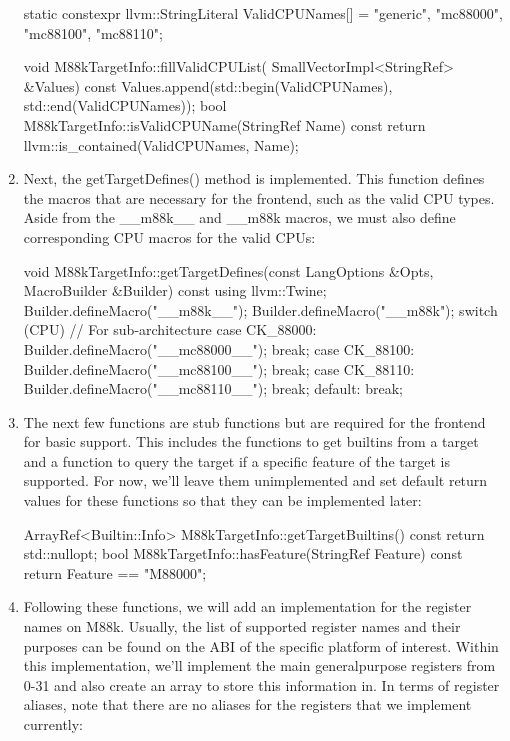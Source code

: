 \begin{enumerate}
\begin{cpp}
static constexpr llvm::StringLiteral ValidCPUNames[] = {
    {"generic"}, {"mc88000"}, {"mc88100"}, {"mc88110"}};

void M88kTargetInfo::fillValidCPUList(
        SmallVectorImpl<StringRef> &Values) const {
    Values.append(std::begin(ValidCPUNames),
    std::end(ValidCPUNames));
}
bool M88kTargetInfo::isValidCPUName(StringRef Name) const {
    return llvm::is_contained(ValidCPUNames, Name);
}
\end{cpp}

\item
Next, the getTargetDefines() method is implemented. This function defines the macros that are necessary for the frontend, such as the valid CPU types. Aside from the \_\_m88k\_\_ and \_\_m88k macros, we must also define corresponding CPU macros for the valid CPUs:

\begin{cpp}
void M88kTargetInfo::getTargetDefines(const LangOptions &Opts,
                                      MacroBuilder &Builder)
const {
    using llvm::Twine;
    Builder.defineMacro("__m88k__");
    Builder.defineMacro("__m88k");
    switch (CPU) { // For sub-architecture
    case CK_88000:
        Builder.defineMacro("__mc88000__");
        break;
    case CK_88100:
    Builder.defineMacro("__mc88100__");
    break;
    case CK_88110:
        Builder.defineMacro("__mc88110__");
        break;
    default:
        break;
    }
}
\end{cpp}

\item
The next few functions are stub functions but are required for the frontend for basic support. This includes the functions to get builtins from a target and a function to query the target if a specific feature of the target is supported. For now, we’ll leave them unimplemented and set default return values for these functions so that they can be implemented later:

\begin{cpp}
ArrayRef<Builtin::Info> M88kTargetInfo::getTargetBuiltins()
const {
    return std::nullopt;
}
bool M88kTargetInfo::hasFeature(StringRef Feature) const {
    return Feature == "M88000";
}
\end{cpp}

\item
Following these functions, we will add an implementation for the register names on M88k. Usually, the list of supported register names and their purposes can be found on the ABI of the specific platform of interest. Within this implementation, we’ll implement the main generalpurpose registers from 0-31 and also create an array to store this information in. In terms of register aliases, note that there are no aliases for the registers that we implement currently:


\end{enumerate}

